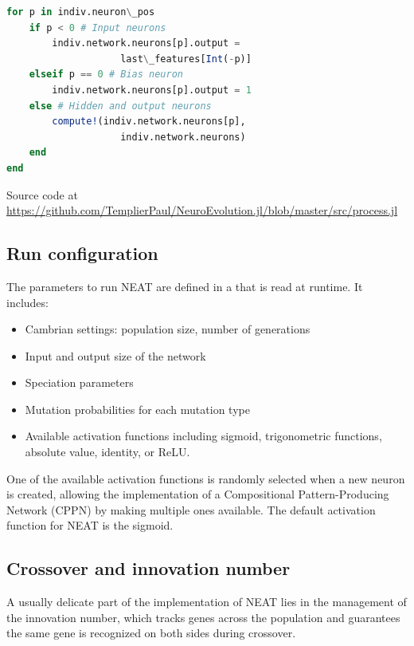 \begin{minipage}{\linewidth}
\begin{lstlisting}[language=Julia, caption=NEAT network processing]
for p in indiv.neuron\_pos
    if p < 0 # Input neurons
        indiv.network.neurons[p].output = 
                    last\_features[Int(-p)]
    elseif p == 0 # Bias neuron
        indiv.network.neurons[p].output = 1
    else # Hidden and output neurons
        compute!(indiv.network.neurons[p], 
                    indiv.network.neurons)
    end
end
\end{lstlisting}
Source code at \url{https://github.com/TemplierPaul/NeuroEvolution.jl/blob/master/src/process.jl}\\
\end{minipage}

\subsection{Run configuration}

The parameters to run NEAT are defined in a   that is read at runtime. It includes:

\begin{itemize}
    \item Cambrian settings: population size, number of generations
    \item Input and output size of the network
    \item Speciation parameters
    \item Mutation probabilities for each mutation type
    \item Available activation functions including sigmoid, trigonometric functions, absolute value, identity, or ReLU. 
\end{itemize}

One of the available activation functions is randomly selected when a new neuron is created, allowing the implementation of a Compositional Pattern-Producing Network (CPPN) by making multiple ones available. The default activation function for NEAT is the sigmoid. 

\subsection{Crossover and innovation number}
A usually delicate part of the implementation of NEAT lies in the management of the innovation number, which tracks genes across the population and guarantees the same gene is recognized on both sides during crossover.

